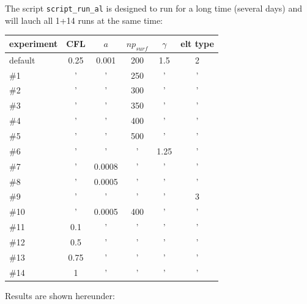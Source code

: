 The script {\tt script\_run\_al} is designed to run for a long time (several days) 
and will lauch all 1+14 runs at the same time: 

\begin{tabular}{lccccc}
\hline
experiment &  CFL   &  $a$   & $np_{surf}$ & $\gamma$ & elt type \\
\hline
\hline
default    &  0.25  &  0.001 & 200         & 1.5      &  2        \\
\#1        &  '     &    '   & 250         & '        &  '        \\
\#2        &  '     &    '   & 300         & '        &  '        \\
\#3        &  '     &    '   & 350         & '        &  '        \\
\#4        &  '     &    '   & 400         & '        &  '        \\
\#5        &  '     &    '   & 500         & '        &  '        \\
\#6        &  '     &    '   & '           & 1.25     &  '        \\
\#7        &  '     & 0.0008 & '           & '        &  '        \\
\#8        &  '     & 0.0005 & '           & '        &  '        \\
\#9        &  '     &    '   & '           & '        &  3        \\
\#10       &  '     & 0.0005 & 400         & '        &  '        \\
\#11       &  0.1   &    '   & '           & '        &  '        \\
\#12       &  0.5   &    '   & '           & '        &  '        \\
\#13       &  0.75  &    '   & '           & '        &  '        \\
\#14       &  1     &    '   & '           & '        &  '        \\
\hline
\end{tabular}

Results are shown hereunder:

